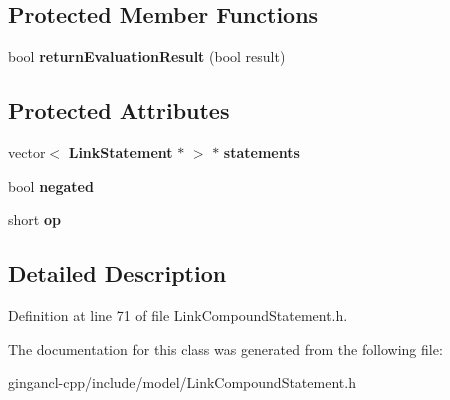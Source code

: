 \subsection*{Protected Member Functions}
\begin{CompactItemize}
\item 
bool \textbf{returnEvaluationResult} (bool result)\label{classbr_1_1pucrio_1_1telemidia_1_1ginga_1_1ncl_1_1model_1_1link_1_1LinkCompoundStatement_086bc86c5249ab52354c8c6984289dff}

\end{CompactItemize}
\subsection*{Protected Attributes}
\begin{CompactItemize}
\item 
vector$<$ {\bf LinkStatement} $\ast$ $>$ $\ast$ {\bf statements}\label{classbr_1_1pucrio_1_1telemidia_1_1ginga_1_1ncl_1_1model_1_1link_1_1LinkCompoundStatement_304c04f17d57ce5cb952aa2fe17b389e}

\item 
bool {\bf negated}\label{classbr_1_1pucrio_1_1telemidia_1_1ginga_1_1ncl_1_1model_1_1link_1_1LinkCompoundStatement_aff9ddb64f4101c1e351eb97f8061c2f}

\item 
short {\bf op}\label{classbr_1_1pucrio_1_1telemidia_1_1ginga_1_1ncl_1_1model_1_1link_1_1LinkCompoundStatement_d974463b4b2532a79f54eb0ade5c0c2d}

\end{CompactItemize}


\subsection{Detailed Description}




Definition at line 71 of file LinkCompoundStatement.h.

The documentation for this class was generated from the following file:\begin{CompactItemize}
\item 
gingancl-cpp/include/model/LinkCompoundStatement.h\end{CompactItemize}
